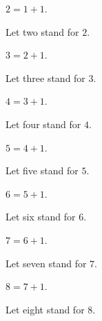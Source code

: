 \documentclass[10pt]{article}
\begin{document}
  \begin{forthel}
    \begin{definition}
      $2 = 1 + 1$.
    \end{definition}

    Let two stand for $2$.
  \end{forthel}

  \begin{forthel}
    \begin{definition}
      $3 = 2 + 1$.
    \end{definition}

    Let three stand for $3$.
  \end{forthel}

  \begin{forthel}
    \begin{definition}
      $4 = 3 + 1$.
    \end{definition}

    Let four stand for $4$.
  \end{forthel}

  \begin{forthel}
    \begin{definition}
      $5 = 4 + 1$.
    \end{definition}

    Let five stand for $5$.
  \end{forthel}

  \begin{forthel}
    \begin{definition}
      $6 = 5 + 1$.
    \end{definition}

    Let six stand for $6$.
  \end{forthel}

  \begin{forthel}
    \begin{definition}
      $7 = 6 + 1$.
    \end{definition}

    Let seven stand for $7$.
  \end{forthel}

  \begin{forthel}
    \begin{definition}
      $8 = 7 + 1$.
    \end{definition}

    Let eight stand for $8$.
  \end{forthel}
\end{document}
